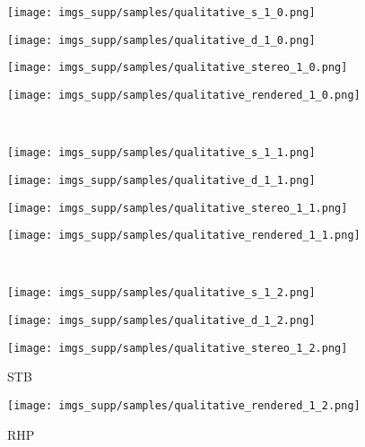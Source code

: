 \documentclass[10pt,twocolumn,letterpaper]{article}
\begin{document}
\begin{figure*}[h]
  \begin{subfigure}[t]{0.29283019\linewidth}
    \texttt{[image: imgs\_supp/samples/qualitative\_s\_1\_0.png]}
  \end{subfigure}
  \begin{subfigure}[t]{0.29283019\linewidth}
    \texttt{[image: imgs\_supp/samples/qualitative\_d\_1\_0.png]}
  \end{subfigure}
  \begin{subfigure}[t]{0.21962264\linewidth}
    \texttt{[image: imgs\_supp/samples/qualitative\_stereo\_1\_0.png]}
  \end{subfigure}
  \begin{subfigure}[t]{0.16471698\linewidth}
    \texttt{[image: imgs\_supp/samples/qualitative\_rendered\_1\_0.png]}
  \end{subfigure}\\
  \begin{subfigure}[t]{0.29283019\linewidth}
    \texttt{[image: imgs\_supp/samples/qualitative\_s\_1\_1.png]}
  \end{subfigure}
  \begin{subfigure}[t]{0.29283019\linewidth}
    \texttt{[image: imgs\_supp/samples/qualitative\_d\_1\_1.png]}
  \end{subfigure}
  \begin{subfigure}[t]{0.21962264\linewidth}
    \texttt{[image: imgs\_supp/samples/qualitative\_stereo\_1\_1.png]}
  \end{subfigure}
  \begin{subfigure}[t]{0.16471698\linewidth}
    \texttt{[image: imgs\_supp/samples/qualitative\_rendered\_1\_1.png]}
  \end{subfigure}\\
  \begin{subfigure}[t]{0.29283019\linewidth}
    \texttt{[image: imgs\_supp/samples/qualitative\_s\_1\_2.png]}
    \caption{}\label{fig:qualitative_ego_s}
  \end{subfigure}
  \begin{subfigure}[t]{0.29283019\linewidth}
    \texttt{[image: imgs\_supp/samples/qualitative\_d\_1\_2.png]}
    \caption{}\label{fig:qualitative_ego_d}
  \end{subfigure}
  \begin{subfigure}[t]{0.21962264\linewidth}
    \texttt{[image: imgs\_supp/samples/qualitative\_stereo\_1\_2.png]}
    \caption{STB }\label{fig:qualitative_stb}
  \end{subfigure}
  \begin{subfigure}[t]{0.16471698\linewidth}
    \texttt{[image: imgs\_supp/samples/qualitative\_rendered\_1\_2.png]}
    \caption{RHP }\label{fig:qualitative_rhp}
  \end{subfigure}
  \vspace{0.2cm}
  \vspace{-0.4cm}
\end{figure*}
\end{document}
